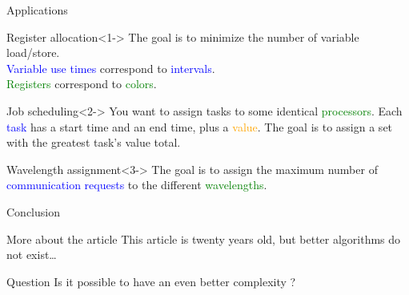 \documentclass[10pt, compress]{beamer}
\begin{document}
\begin{frame}{Applications}

\begin{block}{Register allocation}<1->
The goal is to minimize the number of variable load/store.\\ 
\textcolor{blue}{Variable use times} correspond to \textcolor{blue}{intervals}.\\
\textcolor{green}{Registers} correspond to \textcolor{green}{colors}.
\end{block}

\begin{block}{Job scheduling}<2->
You want to assign tasks to some identical \textcolor{green}{processors}. Each \textcolor{blue}{task} has a start time and an end time, plus a \textcolor{orange}{value}. The goal is to assign a set with the greatest task's value total.
\end{block}

\begin{block}{Wavelength assignment}<3->
The goal is to assign the maximum number of \textcolor{blue}{communication requests} to the different \textcolor{green}{wavelengths}.
\end{block}

\end{frame}


\begin{frame}{Conclusion}

\begin{block}{More about the article}
This article is twenty years old, but better algorithms do not exist\ldots
\end{block}

\begin{block}{Question}
Is it possible to have an even better complexity ?
\end{block}

\end{frame}

\end{document}
